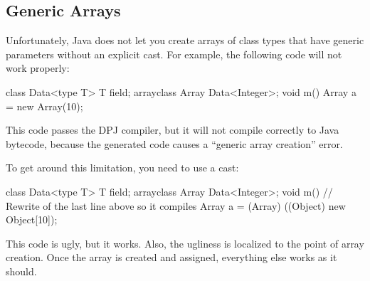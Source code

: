\subsection{Generic Arrays}

Unfortunately, Java does not let you create arrays of class types that
have generic parameters without an explicit cast.  For example, the
following code will not work properly:
%
\begin{dpjlisting}
class Data<type T> {
  T field;
  arrayclass Array {
    Data<Integer>;
  }
  void m() {
    Array a = new Array(10);
  }
}
\end{dpjlisting}
%
This code passes the DPJ compiler, but it will not compile correctly
to Java bytecode, because the generated code causes a ``generic array
creation'' error.

To get around this limitation, you need to use a cast:
%
\begin{dpjlisting}
class Data<type T> {
  T field;
  arrayclass Array {
    Data<Integer>;
  }
  void m() {
    // Rewrite of the last line above so it compiles
    Array a = (Array) ((Object) new Object[10]);
  }
}
\end{dpjlisting}
%
This code is ugly, but it works.  Also, the ugliness is localized to
the point of array creation.  Once the array is created and assigned,
everything else works as it should.

